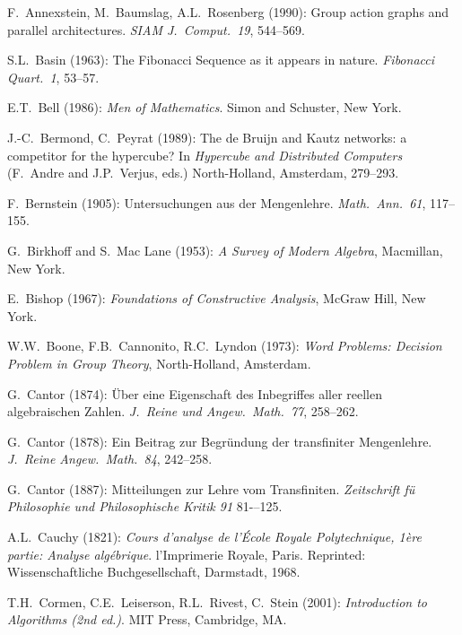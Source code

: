 
\begin{thebibliography}{999}


F.~Annexstein, M.~Baumslag, A.L.~Rosenberg (1990):
Group action graphs and parallel architectures.
{\it SIAM J.~Comput.~19}, 544--569.


S.L.~Basin (1963): The Fibonacci Sequence as it appears in nature.
{\it Fibonacci Quart.~1}, 53--57.

E.T.~Bell (1986):
{\it Men of Mathematics}.
Simon and Schuster, New York.

J.-C.~Bermond, C.~Peyrat (1989):
The de Bruijn and Kautz networks: a competitor for the hypercube?
In {\it Hypercube and Distributed Computers} (F.~Andre and
J.P.~Verjus, eds.)  North-Holland, Amsterdam, 279--293.

F.~Bernstein (1905): Untersuchungen aus der Mengenlehre. {\it
Math.~Ann.~61}, 117--155.

G.~Birkhoff and S.~Mac Lane (1953): {\it A Survey of Modern Algebra},
Macmillan, New York.

E.~Bishop (1967): {\it Foundations of Constructive Analysis},
McGraw Hill, New York.

W.W.~Boone, F.B.~Cannonito, R.C.~Lyndon (1973):
{\it Word Problems: Decision Problem in Group Theory}, North-Holland,
Amsterdam.


G.~Cantor (1874): \"{U}ber eine Eigenschaft des Inbegriffes aller
reellen algebraischen Zahlen.  {\it J.~Reine und Angew.~Math.~77},
258--262.

G.~Cantor (1878): Ein Beitrag zur Begr\"{u}ndung der transfiniter
Mengenlehre.  {\it J.~Reine Angew.~Math.~84}, 242--258.

G.~Cantor (1887): Mitteilungen zur Lehre vom Transfiniten.
{\it Zeitschrift f\"{u} Philosophie und Philosophische Kritik 91}
81-–125.

A.L.~Cauchy (1821): {\it Cours d'analyse de l'\'{E}cole Royale
Polytechnique, 1\`{e}re partie: Analyse alg\'{e}brique}.
l'Imprimerie Royale, Paris.  Reprinted: Wissenschaftliche
Buchgesellschaft, Darmstadt, 1968.

T.H.~Cormen, C.E.~Leiserson, R.L.~Rivest, C.~Stein (2001):
{\it Introduction to Algorithms (2nd ed.)}.
MIT Press, Cambridge, MA.


\end{thebibliography}
